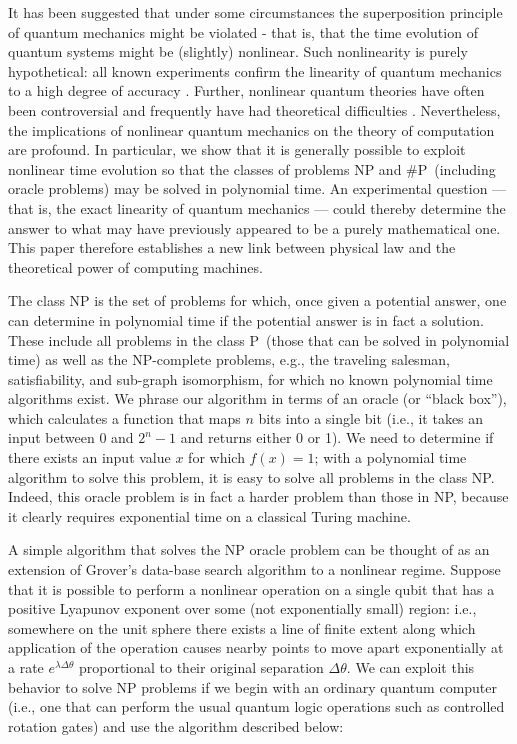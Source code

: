 \documentclass[12pt]{article}
\begin{document}
It has been suggested \cite{Weinberg}\cite{Weinberg 2}\cite{Fivel}\cite{Levy}
\cite{Bertolami} that under some circumstances the superposition principle of
quantum mechanics might be violated - that is, that the time evolution of
quantum systems might be (slightly) nonlinear. Such nonlinearity is purely
hypothetical: all known experiments confirm the linearity of quantum mechanics
to a high degree of accuracy \cite{Majumder}\cite{Walsworth}\cite{Chupp}%
\cite{Bollinger}. Further, nonlinear quantum theories have often been
controversial and frequently have had theoretical difficulties \cite{Peres}
\cite{Polchinski}\cite{Gisin}. Nevertheless, the implications of nonlinear
quantum mechanics on the theory of computation are profound. In particular, we
show that it is generally possible to exploit nonlinear time evolution so that
the classes of problems NP and \#P\ (including oracle problems) may be solved
in polynomial time. An experimental question --- that is, the exact linearity of
quantum mechanics --- could thereby determine the answer to what may have
previously appeared to be a purely mathematical one. This paper therefore
establishes a new link between physical law and the theoretical power of
computing machines.

The class NP is the set of problems for which, once given a potential answer,
one can determine in polynomial time if the potential answer is in fact a
solution. These include all problems in the class P\ (those that can be solved
in polynomial time) as well as the NP-complete problems, e.g., the traveling
salesman, satisfiability, and sub-graph isomorphism, for which no known
polynomial time algorithms exist. We phrase our algorithm in terms of an
oracle (or ``black box''), which calculates a function that maps $n$ bits into a
single bit (i.e., it takes an input between 0 and $2^{n}-1$ and returns either
0 or 1). We need to determine if there exists an input value $x$ for which $f(x)
= 1$; with a polynomial time algorithm to solve this problem, it is easy to
solve all problems in the class NP. Indeed, this oracle problem is in fact a
harder problem than those in NP, because it clearly requires exponential time
on a classical Turing machine.

A simple algorithm that solves the NP oracle problem can be thought of as an
extension of Grover's data-base search algorithm \cite{Grover} to a nonlinear
regime. Suppose that it is possible to perform a nonlinear operation on a
single qubit that has a positive Lyapunov exponent over some (not
exponentially small) region: i.e., somewhere on the unit sphere there exists a
line of finite extent along which application of the operation causes nearby
points to move apart exponentially at a rate $e^{\lambda\Delta\theta}$
proportional to their original separation $\Delta\theta.$ We can exploit this
behavior to solve NP problems if we begin with an ordinary quantum computer
(i.e., one that can perform the usual quantum logic operations such as
controlled rotation gates) and use the algorithm described below:
\end{document}
